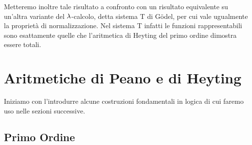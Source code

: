 \documentclass[]{marticle}
\begin{document}
Metteremo inoltre tale risultato a confronto con un risultato equivalente su
un'altra variante del $\lambda$-calcolo, detta sistema T di G\"odel, per cui vale
ugualmente la propriet\`a di normalizzazione. Nel sistema T infatti le funzioni
rappresentabili sono esattamente quelle che l'aritmetica di Heyting del primo
ordine dimostra essere totali.

\section{Aritmetiche di Peano e di Heyting}
Iniziamo con l'introdurre alcune costruzioni fondamentali in logica di cui
faremo uso nelle sezioni successive.

\subsection{Primo Ordine}
\end{document}
